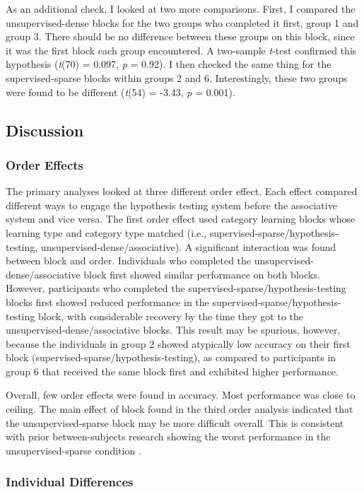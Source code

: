 \documentclass[../dissertation.tex]{subfiles}
\begin{document}
	As an additional check, I looked at two more comparisons. First, I compared the unsupervised-dense blocks for the two groups who completed it first, group 1 and group 3. There should be no difference between these groups on this block, since it was the first block each group encountered.  A two-sample \textit{t}-test confirmed this hypothesis (\textit{t}(70) = 0.097, \textit{p} = 0.92). I then checked the same thing for the supervised-sparse blocks within groups 2 and 6. Interestingly, these two groups were found to be different (\textit{t}(54) = -3.43, \textit{p} = 0.001).
\subsection{Discussion}
\subsubsection{Order Effects}
	The primary analyses looked at three different order effect. Each effect compared different ways to engage the hypothesis testing system before the associative system and vice versa. The first order effect used category learning blocks whose learning type and category type matched (i.e., supervised-sparse/hypothesis-testing, unsupervised-dense/associative). A significant interaction was found between block and order. Individuals who completed the unsupervised-dense/associative block first showed similar performance on both blocks. However, participants who completed the supervised-sparse/hypothesis-testing blocks first showed reduced performance in the supervised-sparse/hypothesis-testing block, with considerable recovery by the time they got to the unsupervised-dense/associative blocks. This result may be spurious, however, because the individuals in group 2 showed atypically low accuracy on their first block (supervised-sparse/hypothesis-testing), as compared to participants in group 6 that received the same block first and exhibited higher performance. \par
	Overall, few order effects were found in accuracy. Most performance was close to ceiling. The main effect of block found in the third order analysis indicated that the unsupervised-sparse block may be more difficult overall. This is consistent with prior between-subjects research showing the worst performance in the unsupervised-sparse condition \citep{Kloos2008}.
\subsubsection{Individual Differences}
\end{document}
